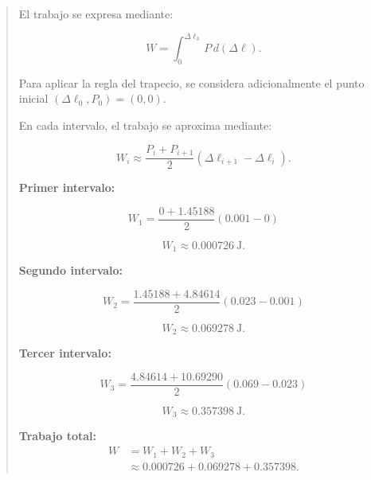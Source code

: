 \documentclass[11pt,a4paper]{article}
\begin{document}
\begin{quote}
El trabajo se expresa mediante:

\begin{equation}
    W=\int_{0}^{\Delta\ell_3}P\,d(\Delta\ell).
\end{equation}

Para aplicar la regla del trapecio, se considera
adicionalmente el punto inicial
$(\Delta\ell_0,P_0)=(0,0)$.

En cada intervalo, el trabajo se aproxima mediante:

\begin{equation}
    W_i \approx
    \frac{P_i+P_{i+1}}{2}
    (\Delta\ell_{i+1}-\Delta\ell_i).
\end{equation}

\medskip

\noindent\textbf{Primer intervalo:}

\begin{equation}
    W_1=
    \frac{0+1.45188}{2}(0.001-0)
\end{equation}

\begin{equation}
    W_1\approx 0.000726\ \mathrm{J}.
\end{equation}

\medskip

\noindent\textbf{Segundo intervalo:}

\begin{equation}
    W_2=
    \frac{1.45188+4.84614}{2}
    (0.023-0.001)
\end{equation}

\begin{equation}
    W_2\approx 0.069278\ \mathrm{J}.
\end{equation}

\medskip

\noindent\textbf{Tercer intervalo:}

\begin{equation}
    W_3=
    \frac{4.84614+10.69290}{2}
    (0.069-0.023)
\end{equation}

\begin{equation}
    W_3\approx 0.357398\ \mathrm{J}.
\end{equation}

\medskip

\noindent\textbf{Trabajo total:}
\begin{align}
    W &= W_1+W_2+W_3 \\
      &\approx 0.000726+0.069278+0.357398.
\end{align}


\end{quote}
\end{document}
